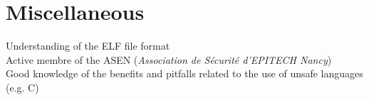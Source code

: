 \documentclass[]{friggeri-cv}
\begin{document}
\section{Miscellaneous}
\begin{entrylist}
  \entry
    {}
    {}
    {}
    {Understanding of the ELF file format\\
    Active membre of the ASEN (\emph{Association de Sécurité d'EPITECH Nancy})\\
    Good knowledge of the benefits and pitfalls related to the use of unsafe languages (e.g. C)}
\end{entrylist}
\end{document}
